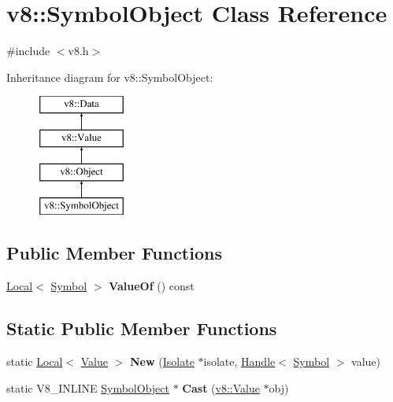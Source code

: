 \hypertarget{classv8_1_1SymbolObject}{}\section{v8\+:\+:Symbol\+Object Class Reference}
\label{classv8_1_1SymbolObject}


{\ttfamily \#include $<$v8.\+h$>$}

Inheritance diagram for v8\+:\+:Symbol\+Object\+:\begin{figure}[H]
\begin{center}
\leavevmode
\includegraphics[height=4.000000cm]{classv8_1_1SymbolObject}
\end{center}
\end{figure}
\subsection*{Public Member Functions}
\begin{DoxyCompactItemize}
\item 
\hypertarget{classv8_1_1SymbolObject_a4a3b439c6784a4a8d9bdc5a246e12b85}{}\hyperlink{classv8_1_1Local}{Local}$<$ \hyperlink{classv8_1_1Symbol}{Symbol} $>$ {\bfseries Value\+Of} () const \label{classv8_1_1SymbolObject_a4a3b439c6784a4a8d9bdc5a246e12b85}

\end{DoxyCompactItemize}
\subsection*{Static Public Member Functions}
\begin{DoxyCompactItemize}
\item 
\hypertarget{classv8_1_1SymbolObject_a74dfdb8fdd78b14f860e3b20dc7bdc9d}{}static \hyperlink{classv8_1_1Local}{Local}$<$ \hyperlink{classv8_1_1Value}{Value} $>$ {\bfseries New} (\hyperlink{classv8_1_1Isolate}{Isolate} $\ast$isolate, \hyperlink{classv8_1_1Handle}{Handle}$<$ \hyperlink{classv8_1_1Symbol}{Symbol} $>$ value)\label{classv8_1_1SymbolObject_a74dfdb8fdd78b14f860e3b20dc7bdc9d}

\item 
\hypertarget{classv8_1_1SymbolObject_aa98d7c4211bd55e347ee8169143fcec9}{}static V8\+\_\+\+I\+N\+L\+I\+N\+E \hyperlink{classv8_1_1SymbolObject}{Symbol\+Object} $\ast$ {\bfseries Cast} (\hyperlink{classv8_1_1Value}{v8\+::\+Value} $\ast$obj)\label{classv8_1_1SymbolObject_aa98d7c4211bd55e347ee8169143fcec9}

\end{DoxyCompactItemize}


